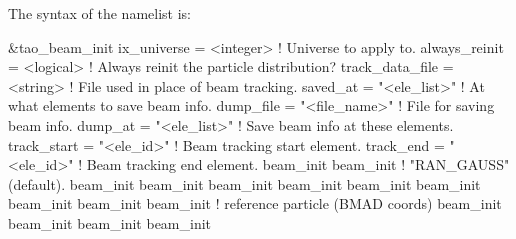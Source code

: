 {{{{{{{{{{{The syntax of the  namelist is:
\begin{example}
  &tao_beam_init
    ix_universe               = <integer>     ! Universe to apply to.
    always_reinit             = <logical>     ! Always reinit the particle distribution?
    track_data_file           = <string>      ! File used in place of beam tracking.
    saved_at                  = "<ele_list>"  ! At what elements to save beam info.
    dump_file                 = "<file_name>" ! File for saving beam info.
    dump_at                   = "<ele_list>"  ! Save beam info at these elements.
    track_start               = "<ele_id>"    ! Beam tracking start element.
    track_end                 = "<ele_id>"    ! Beam tracking end element.
    beam_init%
    beam_init%
                                              !   "RAN_GAUSS" (default).
    beam_init%
    beam_init%
    beam_init%
    beam_init%
    beam_init%
    beam_init%
    beam_init%
    beam_init%
    beam_init%
                                              !   reference particle (BMAD coords)
    beam_init%
    beam_init%
    beam_init%
    beam_init%

\end{example}}}}}}}}}}}}
